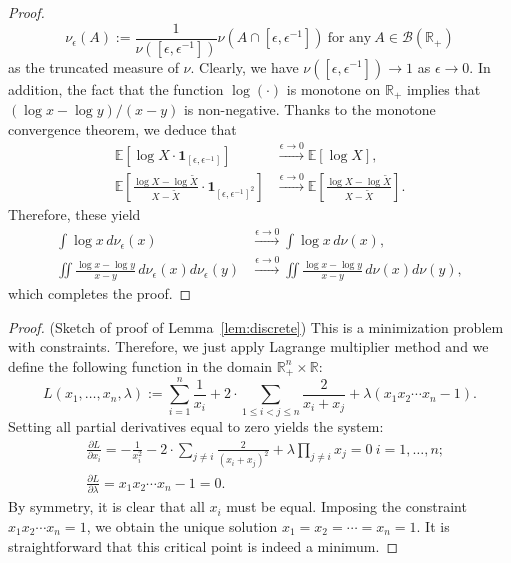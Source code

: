 \documentclass[10pt, reqno]{amsart}
\numberwithin{equation}{section}
\theoremstyle{definition}
\theoremstyle{plain}
\theoremstyle{remark}
\newcommand{\R}{\mathbb{R}}
\newcommand{\E}{\mathbb{E}}
\newcommand{\1}{\mathbbm{1}}
\begin{document}
\begin{proof}
\begin{equation*}
			\nu_{\epsilon}(A):=\frac{1}{\nu([\epsilon,\epsilon^{-1}])}\nu(A\cap [\epsilon,\epsilon^{-1}])\ \text{for any}\ A\in\mathcal{B}(\R_+)
		\end{equation*}
	   as the truncated measure of $\nu $. Clearly, we have $\nu ([\epsilon,\epsilon^{-1}]) \to 1$ as $\epsilon\to 0.$ In addition, the fact that the function $\log (\cdot)$ is monotone on $\R_+$ implies that $(\log x-\log y)/(x-y)$ is non-negative. Thanks to the monotone convergence theorem, we deduce that
	   \begin{align*}
	   	  \E[\log X\cdot \mathbf{1}_{[\epsilon,\epsilon^{-1}]}]&\overset{\epsilon\to 0}{\longrightarrow} \E[\log X],\\
	   	  \E\left[\frac{\log X-\log \tilde{X}}{X-\tilde{X}}\cdot \mathbf{1}_{[\epsilon,\epsilon^{-1}]^2}\right]&\overset{\epsilon\to 0}{\longrightarrow} \E\left[ \frac{\log X-\log \tilde{X}}{X-\tilde{X}} \right].
	   \end{align*}
	   Therefore, these yield
	   \begin{align*}
	   	  \int \log x\,d\nu_{\epsilon}(x)&\overset{\epsilon\to 0}{\longrightarrow} \int \log x\,d\nu(x),\\
	   	  \iint \frac{\log x-\log y}{x-y}\,d\nu_{\epsilon}(x)d\nu_{\epsilon}(y)&\overset{\epsilon\to 0}{\longrightarrow} \iint \frac{\log x-\log y}{x-y}\,d\nu(x)d\nu(y),
	   \end{align*}
	    which completes the proof.
	\end{proof}
	\begin{proof}(Sketch of proof of Lemma~\ref{lem:discrete})
		This is a minimization problem with constraints. Therefore, we just apply Lagrange multiplier method and we define the following function in the domain $\R_+^n\times \R:$
		\begin{equation*}
			L(x_1,\ldots,x_n,\lambda):= \sum_{i=1}^n  \frac{1}{x_i} + 2\cdot \sum_{1\leq i<j\leq n}  \frac{2}{x_i+x_j} + \lambda(x_1x_2\cdots x_n-1).
		\end{equation*}
		Setting all partial derivatives equal to zero yields the system:
		\begin{align*}
			&\frac{\partial L}{\partial x_i}= -\frac{1}{x_i^2} - 2\cdot \sum_{j\ne i}\frac{2}{(x_i+x_j)^2} + \lambda \prod_{j\ne i}x_j =0\ i=1,\ldots, n;\\
			&\frac{\partial L}{\partial \lambda}=x_1x_2\cdots x_n - 1 = 0.
		\end{align*}
		By symmetry, it is clear that all $x_i$ must be equal. Imposing the constraint $ x_1 x_2 \cdots x_n = 1 $, we obtain the unique solution $ x_1 = x_2 = \cdots = x_n = 1 $. It is straightforward that this critical point is indeed a minimum.
	\end{proof}
\end{document}
